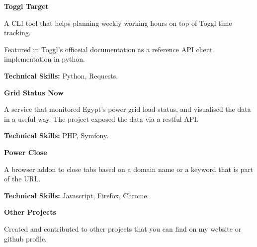 
\begin{cventries}
	\cventry
	{\textbf{Toggl Target}} %
	{} %
	{} %
	{} %
	{
		\begin{cvitems} %
			\item {A CLI tool that helps planning weekly working hours on top of Toggl time tracking.}
			\item {Featured in Toggl's officeial documentation as a reference API client implementation in python.}
			\item {\textbf{Technical Skills:} Python, Requests.}
		\end{cvitems}
	}

	\cventry
	{\textbf{Grid Status Now}} %
	{} %
	{} %
	{} %
	{
		\begin{cvitems} %
			\item {A service that monitored Egypt’s power grid load status, and visualised the data in a useful way. The
			            project exposed the data via a restful API.}
			\item {\textbf{Technical Skills:} PHP, Symfony.}
		\end{cvitems}
	}

	\cventry
	{\textbf{Power Close}} %
	{} %
	{} %
	{} %
	{
		\begin{cvitems} %
			\item {A browser addon to close tabs based on a domain name or a keyword that is part of the URL.}
			\item {\textbf{Technical Skills:} Javascript, Firefox, Chrome.}
		\end{cvitems}
	}

	\cventry
	{\textbf{Other Projects}} %
	{} %
	{} %
	{} %
	{
		\begin{cvitems} %
			\item {Created and contributed to other projects that you can find on my website or github profile.}
		\end{cvitems}
	}
\end{cventries}
